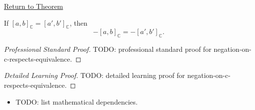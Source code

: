 \newpage
{}
\label{prf:negation-on-c-respects-equivalence}

\begin{remark*}[Return]
\hyperref[lem:negation-on-c-respects-equivalence]{Return to Theorem}
\end{remark*}

\begin{lemma*}
If $[a,b]_{\mathbb{C}}=[a',b']_{\mathbb{C}}$, then
\[
-[a,b]_{\mathbb{C}}=-[a',b']_{\mathbb{C}}.
\]
\end{lemma*}

\begin{proof}[Professional Standard Proof]
\LRAProofBodyStart
TODO: professional standard proof for negation-on-c-respects-equivalence.
\end{proof}

\begin{proof}[Detailed Learning Proof]
\LRAProofBodyStart
TODO: detailed learning proof for negation-on-c-respects-equivalence.
\end{proof}

\begin{remark*}
\end{remark*}

\begin{dependencies}
\begin{itemize}
  \item TODO: list mathematical dependencies.
\end{itemize}
\end{dependencies}

\clearpage
